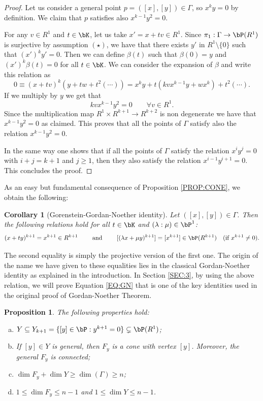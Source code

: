 \documentclass[a4paper,11pt]{amsart}
\newtheorem{corollary}[theorem]{Corollary}
\newtheorem{proposition}[theorem]{Proposition}
\begin{document}
\begin{proof}
Let us consider a general point $p=([x],[y])\in \Gamma$, so $x^ky=0$ by definition. We claim that $p$ satisfies also $x^{k-1}y^2=0$.

For any $v\in R^1$ and $t\in \bK$, let us take $x'=x+tv\in R^1$. Since $\pi_1:\Gamma\to \bP(R^1)$ is surjective by assumption $(\star)$, we have that there exists $y'$ in $R^1\setminus\{0\}$ such that $(x')^ky'=0$. Then we can define $\beta(t)$ such that $\beta(0)=y$ and $(x')^k\beta(t)=0$ for all $t\in \bK$. 
We can consider the expansion of $\beta$ and write this relation as
$$0\equiv(x+tv)^k(y+tw+t^2(\cdots))=x^ky+t(kvx^{k-1}y+wx^k)+t^2(\cdots).$$
If we multiply by $y$ we get that
$$kvx^{k-1}y^2=0 \qquad \forall v\in R^1.$$
Since the multiplication map $R^1\times R^{k+1}\to R^{k+2}$ is non degenerate we have that $x^{k-1}y^2=0$ as claimed. This proves that all the points of $\Gamma$ satisfy also the relation $x^{k-1}y^2=0$. 
\vspace{2mm}

In the same way one shows that if all the points of $\Gamma$ satisfy the relation $x^{i}y^{j}=0$ with $i+j=k+1$ and $j\geq 1$, then they also satisfy the relation $x^{i-1}y^{i+1}=0$. This concludes the proof.
\end{proof}

As an easy but fundamental consequence of Proposition \ref{PROP:CONE}, we obtain the following:
\begin{corollary}[Gorenstein-Gordan-Noether identity]
\label{COR:GGN}
Let $([x],[y])\in \Gamma$. Then the following relations hold for all $t\in \bK$ and $(\lambda:\mu)\in\bP^1$:
\begin{equation}
\label{EQ:GGN}
(x+ty)^{k+1}=x^{k+1}\in R^{k+1}\qquad\mbox{ and }\qquad [(\lambda x+\mu y)^{k+1}]=[x^{k+1}]\in \bP(R^{k+1})\quad (\mbox{if } x^{k+1}\neq 0).
\end{equation}
\end{corollary}

The second equality is simply the projective version of the first one. The origin of the name we have given to these equalities lies in the classical Gordan-Noether identity as explained in the introduction. In Section \ref{SEC:3}, by using the above relation, we will prove Equation \eqref{EQ:GN} that is one of the key identities used in the original proof of Gordan-Noether Theorem.


\begin{proposition}
\label{PROP:DIMY}
The following properties hold:
\begin{enumerate}[(a)]
\item $Y\subseteq Y_{k+1}=  \{[y]\in \bP : y^{k+1}=0\}\subsetneq \bP(R^1)$;
\item If $[y]\in Y$ is general, then $F_y$ is a cone with vertex $[y]$. Moreover, the general $F_y$ is connected;
\item $\dim F_y+\dim Y\geq \dim(\Gamma)\geq n$;
\item $1\leq \dim F_y\leq n-1$ and $1\leq \dim Y\leq n-1$.
\end{enumerate}
\end{proposition}
\end{document}
